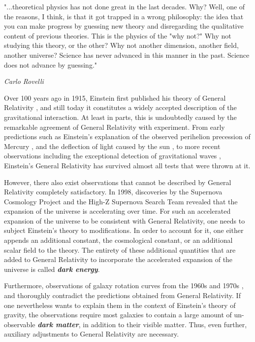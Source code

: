 \setlength{\epigraphwidth}{0.6\textwidth}
\epigraph{"...theoretical physics has not done great in the last decades. Why? Well, one of the reasons, I think, is that it got trapped in a wrong philosophy: the idea that you can make progress by guessing new theory and disregarding the qualitative content of previous theories. This is the physics of the "why not?" Why not studying this theory, or the other? Why not another dimension, another field, another universe? Science has never advanced in this manner in the past. Science does not advance by guessing."}{\textit{Carlo Rovelli}}

Over 100 years ago in 1915, Einstein first published his theory of General Relativity \cite{1915SPAW.......844E}, and still today it constitutes a widely accepted description of the gravitational interaction. 
At least in parts, this is undoubtedly caused by the remarkable agreement of General Relativity with experiment. 
From early predictions such as Einstein's explanation of the observed perihelion precession of Mercury \cite{Einst2}, and the deflection of light caused by the sun \cite{Will2006}, to more recent observations including the exceptional detection of gravitational waves \cite{2016PhRvL.116f1102A}, Einstein's General Relativity has survived almost all tests that were thrown at it.

However, there also exist observations that cannot be described by General Relativity completely satisfactory. In 1998, discoveries by the Supernova Cosmology Project \cite{1999ApJ...517..565P} and the High-Z Supernova Search Team \cite{1998AJ....116.1009R} revealed that the expansion of the universe is accelerating over time. For such an accelerated expansion of the universe to be consistent with General Relativity, one needs to subject Einstein's theory to modifications. In order to account for it, one either appends an additional constant, the cosmological constant, or an additional scalar field to the theory. The entirety of these additional quantities that are added to General Relativity to incorporate the accelerated expansion of the universe is called \textit{\textbf{dark energy}}.

Furthermore, observations of galaxy rotation curves from the 1960s and 1970s \cite{1970ApJ...160..811F}, \cite{1970ApJ...159..379R} and \cite{1980ApJ...238..471R} thoroughly contradict the predictions obtained from General Relativity. If one nevertheless wants to explain them in the context of Einstein's theory of gravity, the observations require most galaxies to contain a large amount of un-observable \textit{\textbf{dark matter}}, in addition to their visible matter. Thus, even further, auxiliary adjustments to General Relativity are necessary. 

